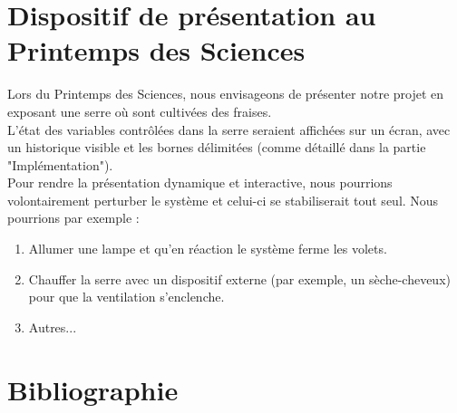 \documentclass[a4paper,10pt]{article}
\begin{document}
\newpage

\vspace{-2cm}


\newpage

\section{Dispositif de présentation au Printemps des Sciences}

Lors du Printemps des Sciences, nous envisageons de présenter notre projet en exposant une serre où sont cultivées des fraises. \\

L'état des variables contrôlées dans la serre seraient affichées sur un écran, avec un historique visible et les bornes délimitées (comme détaillé dans la partie "Implémentation"). \\

Pour rendre la présentation dynamique et interactive, nous pourrions volontairement perturber le système et celui-ci se stabiliserait tout seul. Nous pourrions par exemple :
\begin{enumerate}
	\item Allumer une lampe et qu'en réaction le système ferme les volets.
	\item Chauffer la serre avec un dispositif externe (par exemple, un sèche-cheveux) pour que la ventilation s'enclenche.
	\item Autres... \\
\end{enumerate}

\section{Bibliographie}
\end{document}
